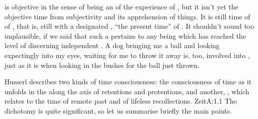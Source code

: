  is objective in the sense of being an  of the
experience of , but it isn't yet the objective time
 from subjectivity and its apprehension of things.  It is still
time of  of , that is, still  with
a designated , ``the present time'' of \herenow.  It shouldn't
sound too implausible, if we said that such a  pertains to any
being which has reached the level of discerning independent . A dog
bringing me a ball and looking expectingly into my eyes, waiting for me to throw
it away is, too, involved into , just as it is when looking in
the bushes for the ball just thrown. 

\pa\label{pa:twoTimesA} Husserl describes two kinds of time consciousness: the
consciousness of time 
as it unfolds in the  along the axis of retentions and
protentions, and another, , which relates to the time of remote past and of lifeless
recollections.
\citet{We could say:
    temporality stands against the inauthentic representation of time, of
    infinite time, time and time relations which are not recognised in
    experience.}{Zeit}{A:1.1   }
The dichotomy is quite significant, so let us summarise briefly
the main points. 

